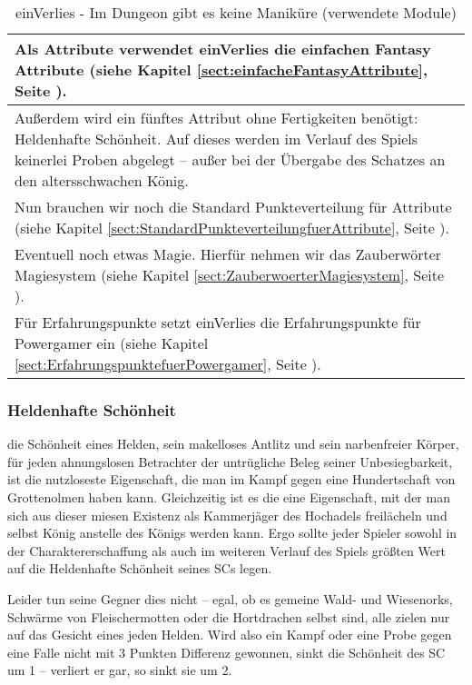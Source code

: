 \begin{table}[H]
\caption{einVerlies - Im Dungeon gibt es keine Maniküre (verwendete Module)}
\label{tab:einVerliesverwendeteModule}
\begin{tabular}{|p{15cm}|}
\hline
Als Attribute verwendet einVerlies die einfachen Fantasy Attribute (siehe Kapitel \ref {sect:einfacheFantasyAttribute}, Seite \pageref {sect:einfacheFantasyAttribute}).\\
\hline
Außerdem wird ein fünftes Attribut ohne Fertigkeiten benötigt: Heldenhafte Schönheit. Auf dieses werden im Verlauf des Spiels keinerlei Proben abgelegt -- außer bei der Übergabe des Schatzes an den altersschwachen König.\\
\hline
Nun brauchen wir noch die Standard Punkteverteilung für Attribute (siehe Kapitel \ref {sect:StandardPunkteverteilungfuerAttribute}, Seite \pageref {sect:StandardPunkteverteilungfuerAttribute}).\\
\hline
Eventuell noch etwas Magie. Hierfür nehmen wir das Zauberwörter Magiesystem (siehe Kapitel \ref {sect:ZauberwoerterMagiesystem}, Seite \pageref {sect:ZauberwoerterMagiesystem}).\\
\hline
Für Erfahrungspunkte setzt einVerlies die Erfahrungspunkte für Powergamer ein (siehe Kapitel \ref {sect:ErfahrungspunktefuerPowergamer}, Seite \pageref {sect:ErfahrungspunktefuerPowergamer}).\\
\hline
\end{tabular}
\end{table}



 
\subsubsection{Heldenhafte Schönheit}

die Schönheit eines Helden, sein makelloses Antlitz und sein narbenfreier Körper, für jeden ahnungslosen Betrachter der untrügliche Beleg seiner Unbesiegbarkeit, ist die nutzloseste Eigenschaft, die man im Kampf gegen eine Hundertschaft von Grottenolmen haben kann. Gleichzeitig ist es die eine Eigenschaft, mit der man sich aus dieser miesen Existenz als Kammerjäger des Hochadels freilächeln und selbst König anstelle des Königs werden kann. Ergo sollte jeder Spieler sowohl in der Charaktererschaffung als auch im weiteren Verlauf des Spiels größten Wert auf die Heldenhafte Schönheit seines SCs legen.

Leider tun seine Gegner dies nicht -- egal, ob es gemeine Wald- und Wiesenorks, Schwärme von Fleischermotten oder die Hortdrachen selbst sind, alle zielen nur auf das Gesicht eines jeden Helden. Wird also ein Kampf oder eine Probe gegen eine Falle nicht mit 3 Punkten Differenz gewonnen, sinkt die Schönheit des SC um 1 -- verliert er gar, so sinkt sie um 2.

